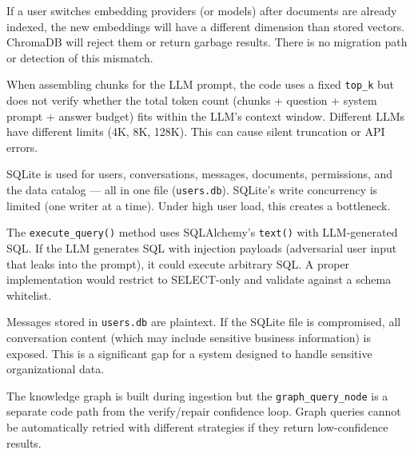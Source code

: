 \documentclass[12pt, a4paper, oneside]{report}
\newcommand{\kw}[1]{\texttt{\small #1}}
\begin{document}
\begin{conbox}
If a user switches embedding providers (or models) after documents are already indexed,
the new embeddings will have a different dimension than stored vectors. ChromaDB will
reject them or return garbage results. There is no migration path or detection of
this mismatch.
\end{conbox}

\begin{conbox}
When assembling chunks for the LLM prompt, the code uses a fixed \kw{top\_k} but does
not verify whether the total token count (chunks + question + system prompt + answer
budget) fits within the LLM's context window. Different LLMs have different limits
(4K, 8K, 128K). This can cause silent truncation or API errors.
\end{conbox}

\begin{conbox}
SQLite is used for users, conversations, messages, documents, permissions, and the data
catalog — all in one file (\kw{users.db}). SQLite's write concurrency is limited (one
writer at a time). Under high user load, this creates a bottleneck.
\end{conbox}

\begin{conbox}
The \kw{execute\_query()} method uses SQLAlchemy's \kw{text()} with LLM-generated SQL.
If the LLM generates SQL with injection payloads (adversarial user input that leaks into
the prompt), it could execute arbitrary SQL. A proper implementation would restrict
to SELECT-only and validate against a schema whitelist.
\end{conbox}

\begin{conbox}
Messages stored in \kw{users.db} are plaintext. If the SQLite file is compromised, all
conversation content (which may include sensitive business information) is exposed. This
is a significant gap for a system designed to handle sensitive organizational data.
\end{conbox}

\begin{conbox}
The knowledge graph is built during ingestion but the \kw{graph\_query\_node} is a
separate code path from the verify/repair confidence loop. Graph queries cannot be
automatically retried with different strategies if they return low-confidence results.
\end{conbox}
\end{document}
